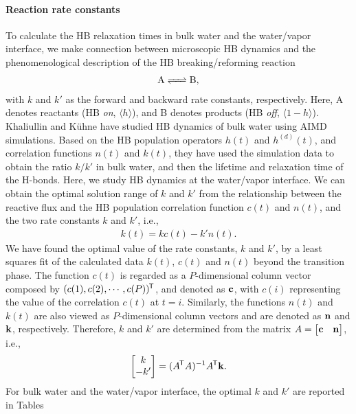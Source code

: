\paragraph{Reaction rate constants}
To calculate the HB relaxation times in bulk water and the water/vapor interface, we
make connection between microscopic HB dynamics and the phenomenological description of the HB breaking/reforming reaction
\begin{align}
\ce{A <=> B},
\end{align}
with $k$ and $k'$ as the forward and backward rate constants, respectively.
Here, A denotes reactants (HB \emph{on}, $\langle h\rangle$), and B denotes products (HB \emph{off}, $\langle 1-h\rangle$)\cite{Chandra2000}.
Khaliullin and K\"uhne have studied HB dynamics of bulk water using AIMD simulations\cite{Khaliullin2013}.
Based on the HB population operators $h(t)$ and $h^{(d)}(t)$, and correlation functions $n(t)$ and $k(t)$, they have used the simulation data 
to obtain the ratio $k/k'$ in bulk water, and then the lifetime and relaxation time 
of the H-bonds.  
Here, we study HB dynamics at the water/vapor interface.
We can obtain the optimal solution range of $k$ and $k'$ from the relationship between the reactive flux 
and the HB population correlation function $c(t)$ and $n(t)$, and the two rate constants $k$ and $k'$, i.e.,
\begin{eqnarray}
  k(t) = kc(t)-k'n(t).
\label{eq:fitting_k_rates}
\end{eqnarray}
We have found the optimal value of the rate constants, $k$ and $k'$, 
by a least squares fit of the calculated data $k(t)$, $c(t)$ and $n(t)$ beyond the transition phase.  
The function $c(t)$ is regarded as a $P$-dimensional column vector composed by $(c(1),c(2),\cdots,c(P)){^{\mkern-1.5mu\mathsf{T}}}$, and denoted as ${\bf c}$,
with $c(i)$ representing the value of the correlation $c(t)$ at $t=i$.
Similarly, the functions $n(t)$ and $k(t)$ are also viewed as $P$-dimensional column vectors and are denoted as ${\bf n}$ and ${\bf k}$, respectively.
Therefore, $k$ and $k'$ are determined from the matrix ${A} = \begin{bmatrix} {\bf c} & {\bf n} \end{bmatrix}$, i.e., 
\begin{equation}
\begin{bmatrix} k\\ -k' \end{bmatrix} = ({A}{^{\mkern-1.5mu\mathsf{T}}} {A})^{-1} {A}{^{\mkern-1.5mu\mathsf{T}}} {\bf k}. 
\end{equation}
For bulk water and the water/vapor interface, the optimal $k$ and $k'$ are reported in Tables 
